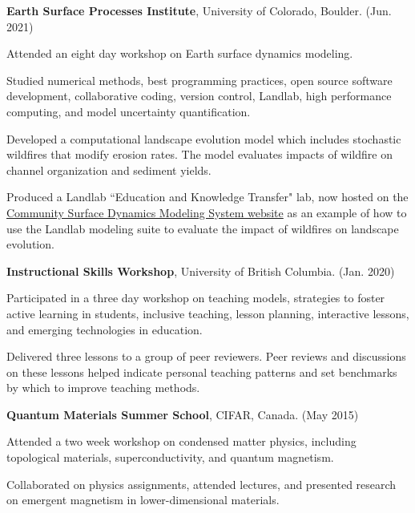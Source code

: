 \documentclass[11pt,letterpaper]{article}
\renewenvironment{itemize}{
	\begin{list}{}{
			\setlength{\leftmargin}{1.5em}
			\setlength{\rightmargin}{0em}  %
			\setlength{\itemsep}{0.25em}
			\setlength{\parskip}{0pt}
			\setlength{\parsep}{0.25em}
		}
	}{
	\end{list}
}
\newenvironment{itemizeit}
{\itemize\let\origitem\item
	\renewcommand{\item}[1][default]
	{\origitem[\tiny $\blacksquare$]}}
{\enditemize}
\renewenvironment{itemize}{
	\begin{list}{}{
			\setlength{\leftmargin}{1.5em}
			\setlength{\itemsep}{0.25em}
			\setlength{\parskip}{0pt}
			\setlength{\parsep}{0.25em}
		}
	}{
	\end{list}
}
\begin{document}
\begin{itemize}
\item {\bf Earth Surface Processes Institute}, University of Colorado, Boulder. \hfill (Jun. 2021)

	\begin{itemizeit} 
		\item Attended an eight day workshop on Earth surface dynamics modeling.
		\item Studied numerical methods, best programming practices, open source software development, collaborative coding, version control, Landlab, high performance computing, and model uncertainty quantification.
		\item Developed a computational landscape evolution model which includes stochastic wildfires that modify erosion rates. The model evaluates impacts of wildfire on channel organization and sediment yields.
		\item Produced a Landlab ``Education and Knowledge Transfer" lab, now hosted on the \href{https://csdms.colorado.edu/wiki/Labs_portal}{Community Surface Dynamics Modeling System website} as an example of how to use the Landlab modeling suite to evaluate the impact of wildfires on landscape evolution.
	\end{itemizeit}

\item {\bf Instructional Skills Workshop}, University of British Columbia. \hfill (Jan. 2020)

	\begin{itemizeit} 
		\item Participated in a three day workshop on teaching models, strategies to foster active learning in students, inclusive teaching, lesson planning, interactive lessons, and emerging technologies in education.
		\item Delivered three lessons to a group of peer reviewers. Peer reviews and discussions on these lessons helped indicate personal teaching patterns and set benchmarks by which to improve teaching methods.
	\end{itemizeit}

\item {\bf Quantum Materials Summer School}, CIFAR, Canada. \hfill (May 2015)%

	\begin{itemizeit}
		\item Attended a two week workshop on condensed matter physics, including topological materials, superconductivity, and quantum magnetism.
		\item Collaborated on physics assignments, attended lectures, and presented research on emergent magnetism in lower-dimensional materials.
	\end{itemizeit}
\end{itemize}
\end{document}
